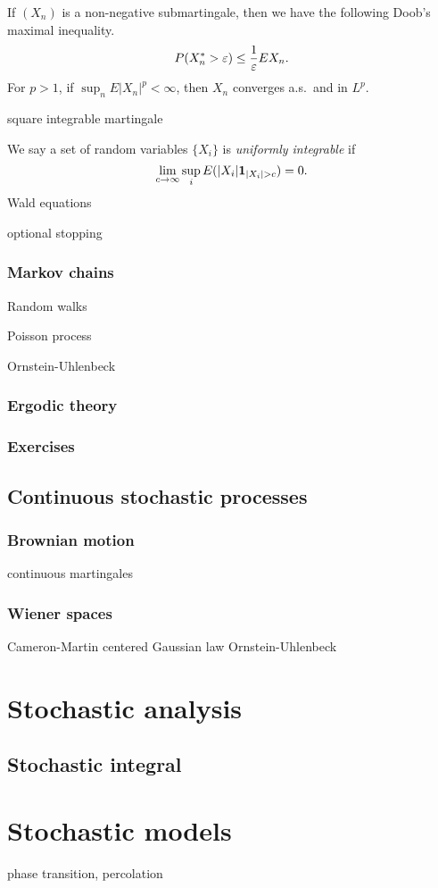 \documentclass{../../large}
\begin{document}
If $(X_n)$ is a non-negative submartingale, then we have the following Doob's maximal inequality.
\[P(X^*_n>\varepsilon)\le\frac1{\varepsilon} EX_n.\]
For $p>1$, if $\sup_nE|X_n|^p<\infty$, then $X_n$ converges a.s.~and in $L^p$.



square integrable martingale

We say a set of random variables $\{X_i\}$ is \emph{uniformly integrable} if
\[\lim_{c\to\infty}\sup_iE(|X_i|\1_{|X_i|>c})=0.\]
Wald equations

optional stopping



\section{Markov chains}


Random walks

Poisson process

Ornstein-Uhlenbeck

\section{Ergodic theory}



\section*{Exercises}



\chapter{Continuous stochastic processes}

\section{Brownian motion}

continuous martingales

\section{Wiener spaces}
Cameron-Martin
centered Gaussian law
Ornstein-Uhlenbeck




\part{Stochastic analysis}

\chapter{Stochastic integral}



\part{Stochastic models}

phase transition, percolation
\end{document}
